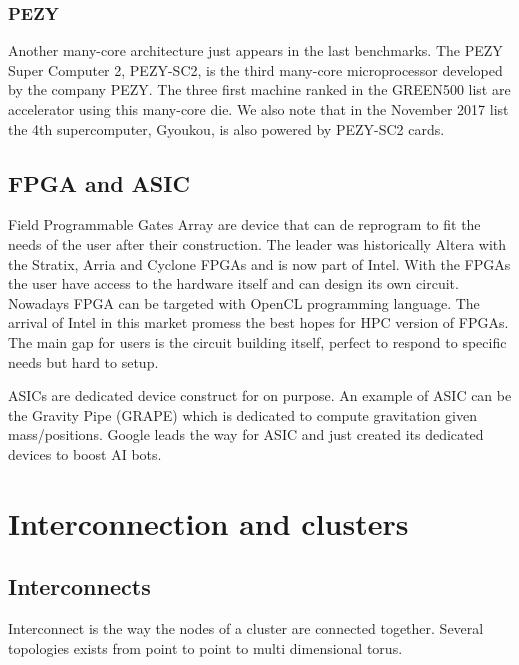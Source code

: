 \subsubsection{PEZY}
Another many-core architecture just appears in the last benchmarks. 
The PEZY Super Computer 2, PEZY-SC2, is the third many-core microprocessor developed by the company PEZY. 
The three first machine ranked in the GREEN500 list are accelerator using this many-core die. 
We also note that in the November 2017 list the 4th supercomputer, Gyoukou, is also powered by PEZY-SC2 cards.

\subsection{FPGA and ASIC}
Field Programmable Gates Array are device that can de reprogram to fit the needs of the user after their construction.
The leader was historically Altera with the Stratix, Arria and Cyclone FPGAs and is now part of Intel. 
With the FPGAs the user have access to the hardware itself and can design its own circuit. 
Nowadays FPGA can be targeted with OpenCL programming language. 
The arrival of Intel in this market promess the best hopes for HPC version of FPGAs. 
The main gap for users is the circuit building itself, perfect to respond to specific needs but hard to setup. 

ASICs are dedicated device construct for on purpose. 
An example of ASIC can be the Gravity Pipe (GRAPE) which is dedicated to compute gravitation given mass/positions.
Google leads the way for ASIC and just created its dedicated devices to boost AI bots. 

\section{Interconnection and clusters}

\subsection{Interconnects}
Interconnect is the way the nodes of a cluster are connected together. 
Several topologies exists from point to point to multi dimensional torus.

